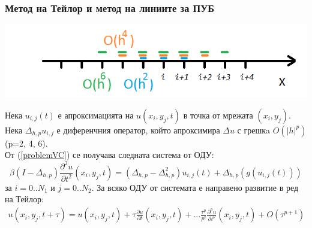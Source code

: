 \documentclass{beamer}
\newcommand{\be}{\begin{equation}}
\newcommand{\ee}{\end{equation}}
\newcommand{\rf}[1]{(\ref{#1})}
\begin{document}

\begin{frame}
\frametitle{Метод на Тейлор и метод на линиите за ПУБ}
\begin{center}\vspace{0.25cm}
	\begin{minipage}[b]{0.45\linewidth}
		 \includegraphics[width=\linewidth]{../amitans/figures/FDS.png}
	\end{minipage}	
\end{center}
Нека $u_{i,j}(t)$ е апроксимацията на $u(x_i, y_j, t)$ в точка от мрежата $(x_i, y_j)$.
\\
Нека $\Delta_{h,p} u_{i,j}$ е диференчния оператор, който апроксимира $\Delta u$ с грешкa $O(|h|^p)$ (p=2, 4, 6).
\\
От \rf{problemVC} се получава следната система от ОДУ:
\be \label{DiscreteEq}
\beta (I-\Delta_{h,p}) \frac{\partial^2 u}{\partial t^2}(x_i, y_j, t)=
 (\Delta_{h,p} - \Delta_{h,p}^2) u_{i, j}(t) + \Delta_{h,p} ( g( u_{i, j}(t) ) )
\ee
за $i = 0..N_1$ и $j=0..N_2$. За всяко ОДУ от системата е направено развитие в ред на Тейлор:
\begin{align} \label{TSe}
u(x_i, y_j, t+\tau) = u(x_i, y_j, t) + \tau \frac{ \partial u }{ \partial t }(x_i, y_j, t)  + ... 
\frac{ \tau^p }{ p! } \frac{ \partial^p u }{ \partial t^p }(x_i, y_j, t) + O(\tau^{p+1})
\end{align}

\end{frame}

\end{document}
